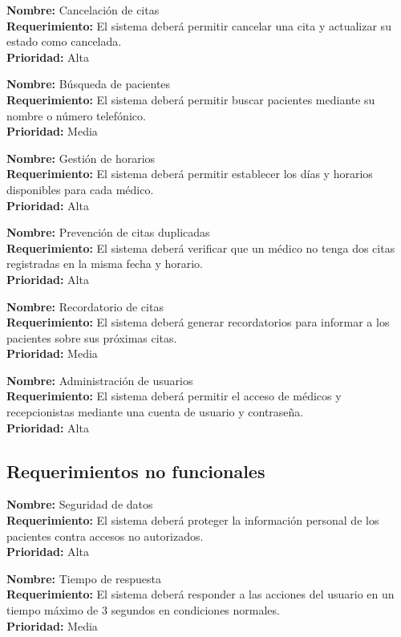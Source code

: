 \documentclass[12pt,a4paper]{article}
\begin{document}
\noindent\textbf{Nombre:} Cancelación de citas \\
\textbf{Requerimiento:} El sistema deberá permitir cancelar una cita y actualizar su estado como cancelada. \\
\textbf{Prioridad:} Alta
\bigskip

\noindent\textbf{Nombre:} Búsqueda de pacientes \\
\textbf{Requerimiento:} El sistema deberá permitir buscar pacientes mediante su nombre o número telefónico. \\
\textbf{Prioridad:} Media
\bigskip

\noindent\textbf{Nombre:} Gestión de horarios \\
\textbf{Requerimiento:} El sistema deberá permitir establecer los días y horarios disponibles para cada médico. \\
\textbf{Prioridad:} Alta
\bigskip

\noindent\textbf{Nombre:} Prevención de citas duplicadas \\
\textbf{Requerimiento:} El sistema deberá verificar que un médico no tenga dos citas registradas en la misma fecha y horario. \\
\textbf{Prioridad:} Alta
\bigskip

\noindent\textbf{Nombre:} Recordatorio de citas \\
\textbf{Requerimiento:} El sistema deberá generar recordatorios para informar a los pacientes sobre sus próximas citas. \\
\textbf{Prioridad:} Media
\bigskip

\noindent\textbf{Nombre:} Administración de usuarios \\
\textbf{Requerimiento:} El sistema deberá permitir el acceso de médicos y recepcionistas mediante una cuenta de usuario y contraseña. \\
\textbf{Prioridad:} Alta
\bigskip

\subsection{Requerimientos no funcionales}

\noindent\textbf{Nombre:} Seguridad de datos \\
\textbf{Requerimiento:} El sistema deberá proteger la información personal de los pacientes contra accesos no autorizados. \\
\textbf{Prioridad:} Alta
\bigskip

\noindent\textbf{Nombre:} Tiempo de respuesta \\
\textbf{Requerimiento:} El sistema deberá responder a las acciones del usuario en un tiempo máximo de 3 segundos en condiciones normales. \\
\textbf{Prioridad:} Media
\bigskip
\end{document}
